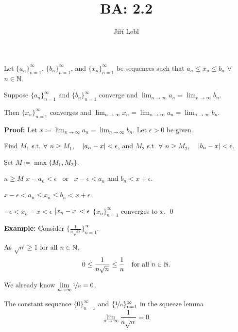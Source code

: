 \documentclass[10pt,aspectratio=169]{beamer}
\author{Ji\v{r}\'i Lebl}
\institute[OSU]{%
Departemento pri Matematiko de Oklahoma {\^S}tata Universitato}
\title{BA: 2.2}
\date{}
\begin{document}
\begin{frame}
\titlepage
\end{frame}

\begin{frame}
\begin{lemma}
Let $\{ a_n \}_{n=1}^\infty$, 
$\{ b_n \}_{n=1}^\infty$, and 
$\{ x_n \}_{n=1}^\infty$ be sequences such that
\quad
$a_n \leq x_n \leq b_n$ \quad $\forall$ $n \in {\mathbb{N}}$.
\pause

Suppose $\{ a_n \}_{n=1}^\infty$ and $\{ b_n \}_{n=1}^\infty$ converge and
\quad
$\displaystyle
\lim_{n\to \infty} a_n
=
\lim_{n\to \infty} b_n$.

\pause
Then $\{ x_n \}_{n=1}^\infty$ converges and
\quad
$\displaystyle
\lim_{n\to \infty} x_n
=
\lim_{n\to \infty} a_n
=
\lim_{n\to \infty} b_n$.
\end{lemma}

\pause
\textbf{Proof:}
Let $\displaystyle x \coloneqq \lim_{n\to\infty} a_n = \lim_{n\to\infty} b_n$.
\pause
Let $\epsilon > 0$ be given.

\pause
Find $M_1$ s.t. $\forall$ $n \geq M_1$, ~
$\left\lvert {a_n-x} \right\rvert < \epsilon$,
\pause
and $M_2$  s.t. $\forall$ $n \geq M_2$,
~ $\left\lvert {b_n-x} \right\rvert < \epsilon$.

\pause
Set $M \coloneqq \max \{M_1, M_2 \}$.

\pause
$n \geq M$
\wthus
$x - a_n < \epsilon$ ~or~ $x - \epsilon < a_n$ \quad
\pause
 and \quad  $b_n < x + \epsilon$.

\pause
\thus \quad
$x - \epsilon < a_n \leq x_n \leq b_n < x + \epsilon$.

\pause
\thus \quad $-\epsilon < x_n-x < \epsilon$
\pause
\wthus $\left\lvert {x_n-x} \right\rvert < \epsilon$
\pause
\wthus
$\{x_n\}_{n=1}^\infty$ converges to $x$.
\qed

\pause
\medskip

\begin{center}
\end{center}

\end{frame}

\begin{frame}

\textbf{Example:}
Consider $\bigl\{ \frac{1}{n\sqrt{n}} \bigr\}_{n=1}^\infty$.

\pause
\medskip

As $\sqrt{n} \geq 1$ for all $n \in {\mathbb{N}}$,
\begin{equation*}
0 \leq \frac{1}{n\sqrt{n}} \leq \frac{1}{n}
\quad \text{for all } n \in {\mathbb{N}}.
\end{equation*}

\pause

We already know $\displaystyle \lim_{n \to \infty} \nicefrac{1}{n} = 0$. 

\medskip
\pause

The constant sequence $\{ 0 \}_{n=1}^\infty$ and $\{ \nicefrac{1}{n}
\}_{n=1}^\infty$ in the
squeeze lemma \quad \thus
\begin{equation*}
\lim_{n\to\infty} \frac{1}{n\sqrt{n}} = 0 .
\end{equation*}

\end{frame}
\end{document}
